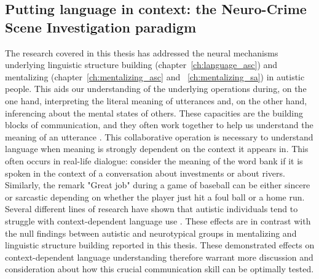 \subsection*{Putting language in context: the Neuro-Crime Scene Investigation paradigm}

The research covered in this thesis has addressed the neural mechanisms underlying linguistic structure building (chapter~\ref{ch:language_asc}) and mentalizing (chapter~\ref{ch:mentalizing_asc} and ~\ref{ch:mentalizing_sa}) in autistic people. This aids our understanding of the underlying operations during, on the one hand, interpreting the literal meaning of utterances and, on the other hand, inferencing about the mental states of others. These capacities are the building blocks of communication, and they often work together to help us understand the meaning of an utterance \citep{basnakova14beyond,ferstl2007,Xu2005}. This collaborative operation is necessary to understand language when meaning is strongly dependent on the context it appears in. This often occurs in real-life dialogue: consider the meaning of the word bank if it is spoken in the context of a conversation about investments or about rivers. Similarly, the remark "Great job" during a game of baseball can be either sincere or sarcastic depending on whether the player just hit a foul ball or a home run. Several different lines of research have shown that autistic individuals tend to struggle with context-dependent language use \citep{angeleri2016,loukusa2007,wadge2019}. These effects are in contrast with the null findings between autistic and neurotypical groups in mentalizing and linguistic structure building reported in this thesis. These demonstrated effects on context-dependent language understanding therefore warrant more discussion and consideration about how this crucial communication skill can be optimally tested.

